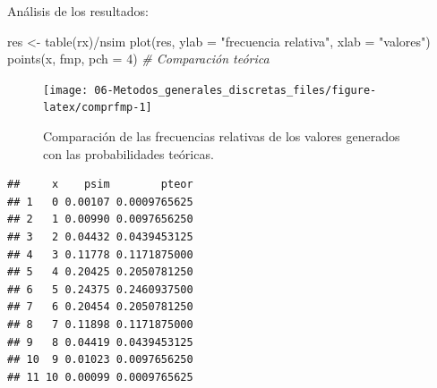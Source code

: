\documentclass[
]{book}
\newenvironment{Shaded}{\begin{snugshade}}{\end{snugshade}}
\newcommand{\AttributeTok}[1]{\textcolor[rgb]{0.77,0.63,0.00}{#1}}
\newcommand{\CommentTok}[1]{\textcolor[rgb]{0.56,0.35,0.01}{\textit{#1}}}
\newcommand{\DecValTok}[1]{\textcolor[rgb]{0.00,0.00,0.81}{#1}}
\newcommand{\FunctionTok}[1]{\textcolor[rgb]{0.00,0.00,0.00}{#1}}
\newcommand{\NormalTok}[1]{#1}
\newcommand{\OtherTok}[1]{\textcolor[rgb]{0.56,0.35,0.01}{#1}}
\newcommand{\SpecialCharTok}[1]{\textcolor[rgb]{0.00,0.00,0.00}{#1}}
\newcommand{\StringTok}[1]{\textcolor[rgb]{0.31,0.60,0.02}{#1}}
\theoremstyle{break}
\theoremstyle{definition}
\theoremstyle{definition}
\theoremstyle{definition}
\theoremstyle{definition}
\theoremstyle{remark}
\begin{document}
Análisis de los resultados:

\begin{Shaded}
\begin{Highlighting}[]
\NormalTok{res }\OtherTok{\textless{}{-}} \FunctionTok{table}\NormalTok{(rx)}\SpecialCharTok{/}\NormalTok{nsim}
\FunctionTok{plot}\NormalTok{(res, }\AttributeTok{ylab =} \StringTok{"frecuencia relativa"}\NormalTok{, }\AttributeTok{xlab =} \StringTok{"valores"}\NormalTok{)}
\FunctionTok{points}\NormalTok{(x, fmp, }\AttributeTok{pch =} \DecValTok{4}\NormalTok{)  }\CommentTok{\# Comparación teórica}
\end{Highlighting}
\end{Shaded}

\begin{figure}[!htb]

{\centering \texttt{[image: 06-Metodos\_generales\_discretas\_files/figure-latex/comprfmp-1]} 

}

\caption{Comparación de las frecuencias relativas de los valores generados con las probabilidades teóricas.}\label{fig:comprfmp}
\end{figure}

\begin{Shaded}
\end{Shaded}

\begin{verbatim}
##     x    psim        pteor
## 1   0 0.00107 0.0009765625
## 2   1 0.00990 0.0097656250
## 3   2 0.04432 0.0439453125
## 4   3 0.11778 0.1171875000
## 5   4 0.20425 0.2050781250
## 6   5 0.24375 0.2460937500
## 7   6 0.20454 0.2050781250
## 8   7 0.11898 0.1171875000
## 9   8 0.04419 0.0439453125
## 10  9 0.01023 0.0097656250
## 11 10 0.00099 0.0009765625
\end{verbatim}

\begin{Shaded}
\end{Shaded}
\end{document}

